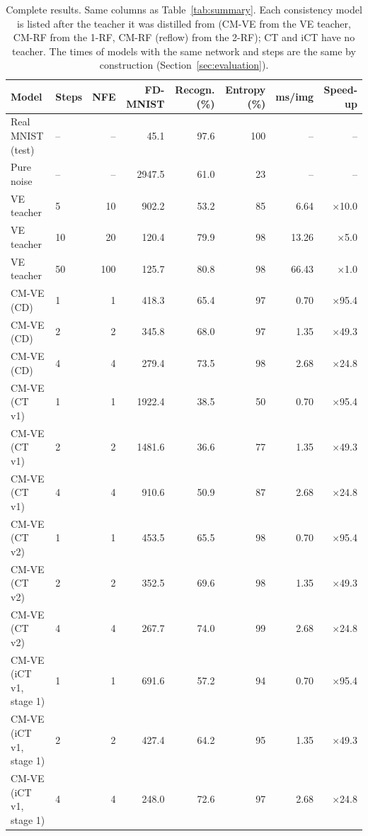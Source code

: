 \documentclass{article}
\begin{document}
\begin{table}[H]
  \caption{Complete results. Same columns as Table~\ref{tab:summary}. Each
  consistency model is listed after the teacher it was distilled from (CM-VE
  from the VE teacher, CM-RF from the 1-RF, CM-RF (reflow) from the 2-RF);
  CT and iCT have no teacher. The times of models with the same network and
  steps are the same by construction (Section~\ref{sec:evaluation}).}
  \label{tab:full}
  \centering
  \footnotesize
  \setlength{\tabcolsep}{4pt}
  \begin{tabular}{llrrrrrr}
    \toprule
    Model & Steps & NFE & FD-MNIST & Recogn. (\%) & Entropy (\%) & ms/img & Speed-up \\
    \midrule
    Real MNIST (test) & -- & -- & 45.1 & 97.6 & 100 & -- & -- \\
    Pure noise & -- & -- & 2947.5 & 61.0 & 23 & -- & -- \\
    \midrule
    VE teacher & 5 & 10 & 902.2 & 53.2 & 85 & 6.64 & $\times$10.0 \\
    VE teacher & 10 & 20 & 120.4 & 79.9 & 98 & 13.26 & $\times$5.0 \\
    VE teacher & 50 & 100 & 125.7 & 80.8 & 98 & 66.43 & $\times$1.0 \\
    \midrule
    CM-VE (CD) & 1 & 1 & 418.3 & 65.4 & 97 & 0.70 & $\times$95.4 \\
    CM-VE (CD) & 2 & 2 & 345.8 & 68.0 & 97 & 1.35 & $\times$49.3 \\
    CM-VE (CD) & 4 & 4 & 279.4 & 73.5 & 98 & 2.68 & $\times$24.8 \\
    \midrule
    CM-VE (CT v1) & 1 & 1 & 1922.4 & 38.5 & 50 & 0.70 & $\times$95.4 \\
    CM-VE (CT v1) & 2 & 2 & 1481.6 & 36.6 & 77 & 1.35 & $\times$49.3 \\
    CM-VE (CT v1) & 4 & 4 & 910.6 & 50.9 & 87 & 2.68 & $\times$24.8 \\
    \midrule
    CM-VE (CT v2) & 1 & 1 & 453.5 & 65.5 & 98 & 0.70 & $\times$95.4 \\
    CM-VE (CT v2) & 2 & 2 & 352.5 & 69.6 & 98 & 1.35 & $\times$49.3 \\
    CM-VE (CT v2) & 4 & 4 & 267.7 & 74.0 & 99 & 2.68 & $\times$24.8 \\
    \midrule
    CM-VE (iCT v1, stage 1) & 1 & 1 & 691.6 & 57.2 & 94 & 0.70 & $\times$95.4 \\
    CM-VE (iCT v1, stage 1) & 2 & 2 & 427.4 & 64.2 & 95 & 1.35 & $\times$49.3 \\
    CM-VE (iCT v1, stage 1) & 4 & 4 & 248.0 & 72.6 & 97 & 2.68 & $\times$24.8 \\

\end{tabular}
\end{table}
\end{document}
